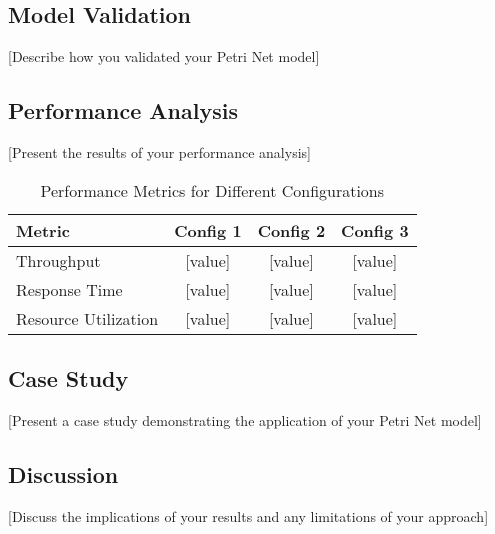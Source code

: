 \label{sec:results}

\subsection{Model Validation}

[Describe how you validated your Petri Net model]

\subsection{Performance Analysis}

[Present the results of your performance analysis]

\begin{table}[htbp]
\centering
\caption{Performance Metrics for Different Configurations}
\label{tab:performance}
\begin{tabular}{@{}lccc@{}}
\toprule
\textbf{Metric} & \textbf{Config 1} & \textbf{Config 2} & \textbf{Config 3} \\
\midrule
Throughput & [value] & [value] & [value] \\
Response Time & [value] & [value] & [value] \\
Resource Utilization & [value] & [value] & [value] \\
\bottomrule
\end{tabular}
\end{table}

\subsection{Case Study}

[Present a case study demonstrating the application of your Petri Net model]

\subsection{Discussion}

[Discuss the implications of your results and any limitations of your approach]
